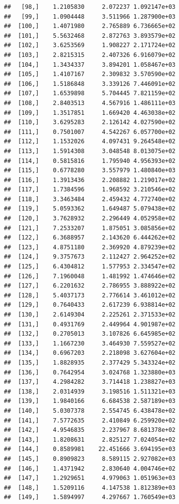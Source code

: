 \documentclass[article]{jss}\usepackage[]{graphicx}\usepackage[]{xcolor}
\makeatletter
\newenvironment{kframe}{%
 \def\at@end@of@kframe{}%
 \ifinner\ifhmode%
  \def\at@end@of@kframe{\end{minipage}}%
  \begin{minipage}{\columnwidth}%
 \fi\fi%
 \def\FrameCommand##1{\hskip\@totalleftmargin \hskip-\fboxsep
 \colorbox{shadecolor}{##1}\hskip-\fboxsep
     \hskip-\linewidth \hskip-\@totalleftmargin \hskip\columnwidth}%
 \MakeFramed {\advance\hsize-\width
   \@totalleftmargin\z@ \linewidth\hsize
   \@setminipage}}%
 {\par\unskip\endMakeFramed%
 \at@end@of@kframe}
\newenvironment{knitrout}{}{} %
\makeatother
\begin{document}
\begin{knitrout}
\begin{kframe}
\begin{verbatim}
##   [98,]    1.2105830     2.072237 1.092147e+03
##   [99,]    1.0904448     3.511966 1.287900e+03
##  [100,]    1.4071980     2.765889 6.736665e+02
##  [101,]    5.5632468     2.872763 3.893579e+02
##  [102,]    3.6253569     1.908227 2.171724e+02
##  [103,]    2.8215315     2.407326 6.916079e+02
##  [104,]    1.3434337     3.894201 1.058467e+03
##  [105,]    1.4107167     2.309832 3.570590e+02
##  [106,]    1.5186848     3.339126 7.446091e+02
##  [107,]    1.6539898     5.704445 7.821159e+02
##  [108,]    2.8403513     4.567916 1.486111e+03
##  [109,]    1.3517851     1.669420 4.463038e+02
##  [110,]    3.6295283     2.126142 4.027590e+02
##  [111,]    0.7501007     4.542267 6.057700e+02
##  [112,]    1.1532026     4.097431 9.264548e+02
##  [113,]    1.5914308     3.048548 8.013075e+02
##  [114,]    0.5815816     1.795940 4.956393e+02
##  [115,]    0.6778280     3.557979 1.480840e+03
##  [116,]    1.3913436     2.208882 1.219017e+02
##  [117,]    1.7384596     1.968592 3.210546e+02
##  [118,]    3.3463484     2.459432 4.772740e+02
##  [119,]    5.0593362     1.649487 5.079438e+02
##  [120,]    3.7628932     2.296449 4.052958e+02
##  [121,]    7.2533207     1.875051 3.085856e+02
##  [122,]    6.3688957     2.143620 6.444262e+02
##  [123,]    4.8751180     2.369920 4.879239e+02
##  [124,]    9.3757673     2.112427 2.964252e+02
##  [125,]    6.4304812     1.577953 2.334547e+02
##  [126,]    7.1960048     1.481992 1.474646e+02
##  [127,]    6.2201632     2.786955 3.888922e+02
##  [128,]    5.4037173     2.776614 3.461012e+02
##  [129,]    0.7640433     2.617239 6.938814e+02
##  [130,]    2.6149304     2.225261 2.371533e+02
##  [131,]    0.4931769     2.449964 4.901987e+02
##  [132,]    0.2705013     3.107826 6.645985e+02
##  [133,]    1.1667230     3.464930 7.559527e+02
##  [134,]    0.6967203     2.218098 3.627604e+02
##  [135,]    1.8828935     2.377429 5.343324e+02
##  [136,]    0.7642954     3.024768 1.323880e+03
##  [137,]    4.2984282     3.714418 1.238827e+03
##  [138,]    2.0314939     3.198516 1.511321e+03
##  [139,]    1.9840166     6.684538 2.587189e+03
##  [140,]    5.0307378     2.554745 6.438478e+02
##  [141,]    7.5772635     2.410849 6.259920e+02
##  [142,]    4.9546835     2.237967 8.681378e+02
##  [143,]    1.8208631     2.825127 7.024054e+02
##  [144,]    0.8589981    22.451666 3.694195e+03
##  [145,]    0.8909823     8.589115 2.927082e+03
##  [146,]    1.4371942     2.830640 4.004746e+02
##  [147,]    1.2929651     4.979063 1.051963e+03
##  [148,]    1.5209116     4.147538 1.812389e+03
##  [149,]    1.5894997     4.297667 1.760549e+03

\end{verbatim}
\end{kframe}
\end{knitrout}
\end{document}
